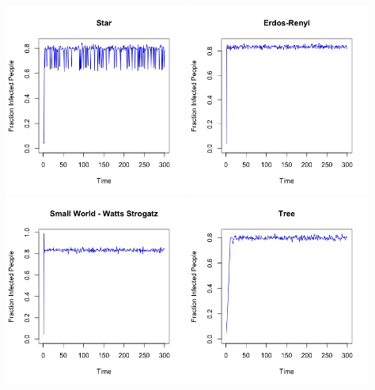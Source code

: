 \documentclass{article}
\begin{document}
\begin{center}
   
    
    \includegraphics[width=6cm]{star_2.jpeg}
    \includegraphics[width=6cm]{erdos_renyi_2.jpeg}
    \includegraphics[width=6cm]{watts_strogatz_2.jpeg}
    \includegraphics[width=6cm]{tree_2.jpeg}

\end{center}
\end{document}
